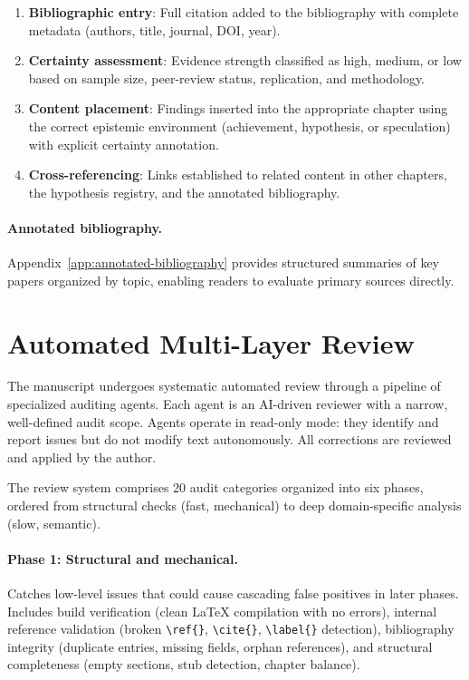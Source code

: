 \begin{enumerate}
\item \textbf{Bibliographic entry}: Full citation added to the bibliography with complete metadata (authors, title, journal, DOI, year).
\item \textbf{Certainty assessment}: Evidence strength classified as high, medium, or low based on sample size, peer-review status, replication, and methodology.
\item \textbf{Content placement}: Findings inserted into the appropriate chapter using the correct epistemic environment (achievement, hypothesis, or speculation) with explicit certainty annotation.
\item \textbf{Cross-referencing}: Links established to related content in other chapters, the hypothesis registry, and the annotated bibliography.
\end{enumerate}

\paragraph{Annotated bibliography.}
Appendix~\ref{app:annotated-bibliography} provides structured summaries of key papers organized by topic, enabling readers to evaluate primary sources directly.

\section*{Automated Multi-Layer Review}
\label{sec:meth-review}

The manuscript undergoes systematic automated review through a pipeline of specialized auditing agents. Each agent is an AI-driven reviewer with a narrow, well-defined audit scope. Agents operate in read-only mode: they identify and report issues but do not modify text autonomously. All corrections are reviewed and applied by the author.

The review system comprises 20 audit categories organized into six phases, ordered from structural checks (fast, mechanical) to deep domain-specific analysis (slow, semantic).

\paragraph{Phase 1: Structural and mechanical.}
Catches low-level issues that could cause cascading false positives in later phases. Includes build verification (clean \LaTeX{} compilation with no errors), internal reference validation (broken \verb|\ref{}|, \verb|\cite{}|, \verb|\label{}| detection), bibliography integrity (duplicate entries, missing fields, orphan references), and structural completeness (empty sections, stub detection, chapter balance).

